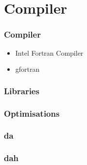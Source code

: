 \section{Compiler}
\begin{frame}
    \frametitle{Compiler}
    \begin{itemize}
        \item Intel Fortran Compiler
        \item gfortran
    \end{itemize}
\end{frame}
\begin{frame}
    \frametitle{Libraries}
\end{frame}
\begin{frame}
    \frametitle{Optimisations}
\end{frame}
\begin{frame}
    \frametitle{da}
\end{frame}
\begin{frame}
    \frametitle{dah}
\end{frame}
